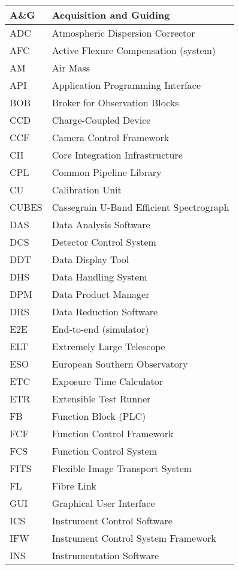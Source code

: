 \begin{longtable}{ |l|l| }
A\&G & Acquisition and Guiding \\ \hline
ADC & Atmospheric Dispersion Corrector \\ \hline
AFC & Active Flexure Compensation (system) \\ \hline
AM & Air Mass \\ \hline
API & Application Programming Interface \\ \hline
BOB & Broker for Observation Blocks \\ \hline
CCD & Charge-Coupled Device \\ \hline
CCF & Camera Control Framework \\ \hline
CII & Core Integration Infrastructure \\ \hline
CPL & Common Pipeline Library \\ \hline
CU & Calibration Unit \\ \hline
CUBES & Cassegrain U-Band Efficient Spectrograph \\ \hline
DAS & Data Analysis Software \\ \hline
DCS & Detector Control System \\ \hline
DDT & Data Display Tool \\ \hline
DHS & Data Handling System \\ \hline
DPM & Data Product Manager \\ \hline
DRS & Data Reduction Software \\ \hline
E2E & End-to-end (simulator) \\ \hline
ELT & Extremely Large Telescope \\ \hline
ESO & European Southern Observatory \\ \hline
ETC & Exposure Time Calculator \\ \hline
ETR & Extensible Test Runner \\ \hline
FB & Function Block (PLC) \\ \hline
FCF & Function Control Framework \\ \hline
FCS & Function Control System \\ \hline
FITS & Flexible Image Transport System \\ \hline
FL & Fibre Link \\ \hline
GUI & Graphical User Interface \\ \hline
ICS & Instrument Control Software \\ \hline
IFW & Instrument Control System Framework \\ \hline
INS & Instrumentation Software \\ \hline

\end{longtable}
